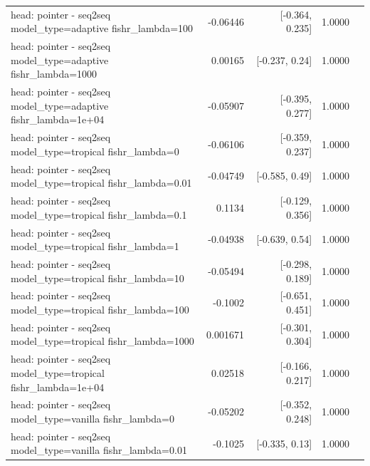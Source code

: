 \documentclass[10pt]{article}
\makeatletter
\newcommand{\stackcell}[1]{\begin{tabular}[t]{@{}l@{}}#1\end{tabular}}
\makeatother
\begin{document}
{\begin{longtable}{lrrrl}
\stackcell{head: pointer - seq2seq\\\footnotesize model\_type=adaptive fishr\_lambda=100 } & -0.06446 & [-0.364, 0.235] & 1.0000 & \\
\stackcell{head: pointer - seq2seq\\\footnotesize model\_type=adaptive fishr\_lambda=1000 } & 0.00165 & [-0.237, 0.24] & 1.0000 & \\
\stackcell{head: pointer - seq2seq\\\footnotesize model\_type=adaptive fishr\_lambda=1e+04 } & -0.05907 & [-0.395, 0.277] & 1.0000 & \\
\stackcell{head: pointer - seq2seq\\\footnotesize model\_type=tropical fishr\_lambda=0 } & -0.06106 & [-0.359, 0.237] & 1.0000 & \\
\stackcell{head: pointer - seq2seq\\\footnotesize model\_type=tropical fishr\_lambda=0.01 } & -0.04749 & [-0.585, 0.49] & 1.0000 & \\
\stackcell{head: pointer - seq2seq\\\footnotesize model\_type=tropical fishr\_lambda=0.1 } & 0.1134 & [-0.129, 0.356] & 1.0000 & \\
\stackcell{head: pointer - seq2seq\\\footnotesize model\_type=tropical fishr\_lambda=1 } & -0.04938 & [-0.639, 0.54] & 1.0000 & \\
\stackcell{head: pointer - seq2seq\\\footnotesize model\_type=tropical fishr\_lambda=10 } & -0.05494 & [-0.298, 0.189] & 1.0000 & \\
\stackcell{head: pointer - seq2seq\\\footnotesize model\_type=tropical fishr\_lambda=100 } & -0.1002 & [-0.651, 0.451] & 1.0000 & \\
\stackcell{head: pointer - seq2seq\\\footnotesize model\_type=tropical fishr\_lambda=1000 } & 0.001671 & [-0.301, 0.304] & 1.0000 & \\
\stackcell{head: pointer - seq2seq\\\footnotesize model\_type=tropical fishr\_lambda=1e+04 } & 0.02518 & [-0.166, 0.217] & 1.0000 & \\
\stackcell{head: pointer - seq2seq\\\footnotesize model\_type=vanilla fishr\_lambda=0 } & -0.05202 & [-0.352, 0.248] & 1.0000 & \\
\stackcell{head: pointer - seq2seq\\\footnotesize model\_type=vanilla fishr\_lambda=0.01 } & -0.1025 & [-0.335, 0.13] & 1.0000 & \\

\end{longtable}}
\end{document}
